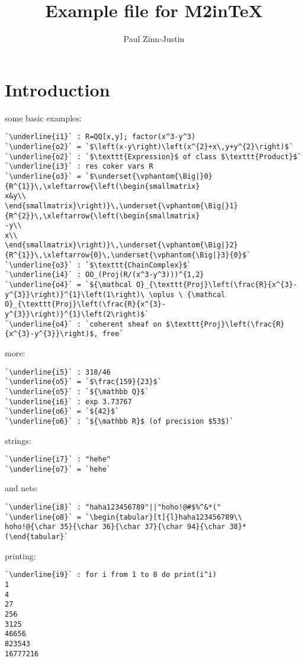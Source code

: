 \documentclass[12pt,a4paper]{amsart}
\title{Example file for M2inTeX}
\author{Paul Zinn-Justin}
\begin{document}
\maketitle

\section{Introduction}
some basic examples:
\begin{lstlisting}[language=Macaulay2]
`\underline{i1}` : R=QQ[x,y]; factor(x^3-y^3)
`\underline{o2}` = `$\left(x-y\right)\left(x^{2}+x\,y+y^{2}\right)$`
`\underline{o2}` : `$\texttt{Expression}$ of class $\texttt{Product}$`
`\underline{i3}` : res coker vars R
`\underline{o3}` = `$\underset{\vphantom{\Big|}0}{R^{1}}\,\xleftarrow{\left(\begin{smallmatrix}
x&y\\
\end{smallmatrix}\right)}\,\underset{\vphantom{\Big|}1}{R^{2}}\,\xleftarrow{\left(\begin{smallmatrix}
-y\\
x\\
\end{smallmatrix}\right)}\,\underset{\vphantom{\Big|}2}{R^{1}}\,\xleftarrow{0}\,\underset{\vphantom{\Big|}3}{0}$`
`\underline{o3}` : `$\texttt{ChainComplex}$`
`\underline{i4}` : OO_(Proj(R/(x^3-y^3)))^{1,2}
`\underline{o4}` = `${\mathcal O}_{\texttt{Proj}\left(\frac{R}{x^{3}-y^{3}}\right)}^{1}\left(1\right)\ \oplus \ {\mathcal O}_{\texttt{Proj}\left(\frac{R}{x^{3}-y^{3}}\right)}^{1}\left(2\right)$`
`\underline{o4}` : `coherent sheaf on $\texttt{Proj}\left(\frac{R}{x^{3}-y^{3}}\right)$, free`\end{lstlisting}
more:
\begin{lstlisting}[language=Macaulay2]
`\underline{i5}` : 318/46
`\underline{o5}` = `$\frac{159}{23}$`
`\underline{o5}` : `${\mathbb Q}$`
`\underline{i6}` : exp 3.73767
`\underline{o6}` = `${42}$`
`\underline{o6}` : `${\mathbb R}$ (of precision $53$)`\end{lstlisting}
strings:
\begin{lstlisting}[language=Macaulay2]
`\underline{i7}` : "hehe"
`\underline{o7}` = `hehe`\end{lstlisting}
and nets:
\begin{lstlisting}[language=Macaulay2]
`\underline{i8}` : "haha123456789"||"hoho!@#$%^&*("
`\underline{o8}` = `\begin{tabular}[t]{l}haha123456789\\
hoho!@{\char 35}{\char 36}{\char 37}{\char 94}{\char 38}*(\end{tabular}`\end{lstlisting}
printing:
\begin{lstlisting}[language=Macaulay2]
`\underline{i9}` : for i from 1 to 8 do print(i^i)
1
4
27
256
3125
46656
823543
16777216\end{lstlisting}
\end{document}
